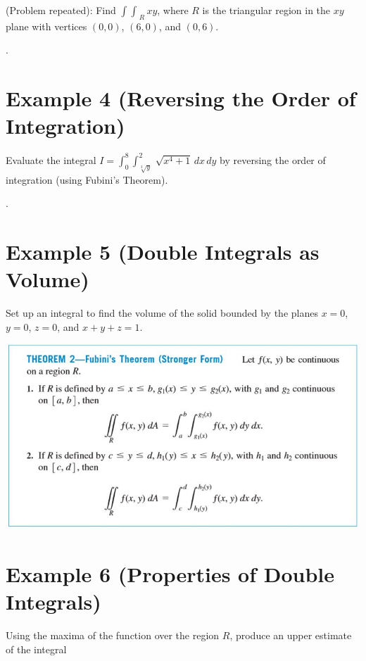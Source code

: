 \documentclass[11pt]{article}
\begin{document}
(Problem repeated): Find $\int \int_{\; R} xy$, where $R$ is the triangular region in the $xy$ plane with vertices $(0,0)$, $(6,0)$, and $(0,6)$. \\

\newpage

.

\newpage

\section*{Example 4 (Reversing the Order of Integration)}

Evaluate the integral $I = \int_{0}^{8} \int_{\sqrt[3]{y}}^{2} \, \sqrt{x^4+1} \, dx \, dy$ by reversing the order of integration (using Fubini's Theorem). 




\newpage

.

\newpage

\section*{Example 5 (Double Integrals as Volume)}

Set up an integral to find the volume of the solid bounded by the planes $x=0$, $y=0$, $z=0$, and $x+y+z = 1$.



\newpage

\includegraphics{Capture2.jpg}

\newpage


\section*{Example 6 (Properties of Double Integrals)}

Using the maxima of the function over the region $R$,
produce an upper estimate of the integral 
\end{document}
